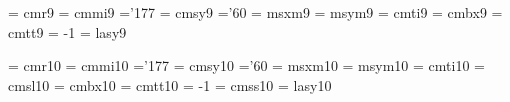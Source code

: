  \font\ninrm  = cmr9               %
 \font\ninmi  = cmmi9              %
    \skewchar\ninmi ='177          %
 \font\ninsy  = cmsy9              %
    \skewchar\ninsy ='60           %
 \font\ninxm  = msxm9		   %
 \font\ninym  = msym9		   %
 \font\ninit  = cmti9              %
 \font\ninbf  = cmbx9              %
 \font\nintt  = cmtt9              %
    \hyphenchar\nintt = -1         %
 \font\ninly  = lasy9             %

 \font\tenrm  = cmr10    %
 \font\tenmi  = cmmi10   %
    \skewchar\tenmi ='177  %
 \font\tensy  = cmsy10   %
    \skewchar\tensy ='60 %
 \font\tenxm  = msxm10	 %
 \font\tenym  = msym10	 %
 \font\tenit  = cmti10   %
 \font\tensl  = cmsl10   %
 \font\tenbf  = cmbx10   %
 \font\tentt  = cmtt10   %
    \hyphenchar\tentt = -1         %
 \font\tensf  = cmss10   %
 \font\tenly  = lasy10  %

